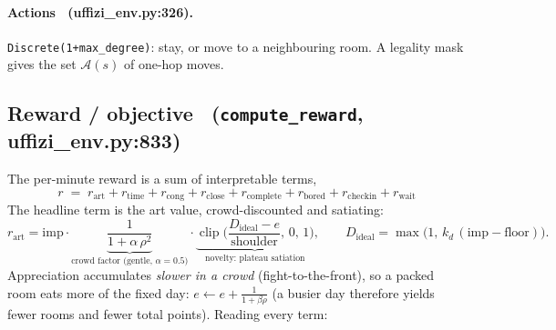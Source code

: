 \documentclass[11pt]{article}
\newcommand{\file}[1]{\texttt{\small #1}}
\newcommand{\co}[1]{\texttt{\small #1}}
\newcommand{\Acal}{\mathcal{A}}
\begin{document}
\paragraph{Actions \ (uffizi\_env.py:326).} \co{Discrete(1+max\_degree)}: stay, or move
to a neighbouring room. A legality mask gives the set $\Acal(s)$ of one-hop moves.

\subsection{Reward / objective \ (\file{compute\_reward}, uffizi\_env.py:833)}

The per-minute reward is a sum of interpretable terms,
\[
\boxed{\;r \;=\; r_{\text{art}} + r_{\text{time}} + r_{\text{cong}} + r_{\text{close}} + r_{\text{complete}} + r_{\text{bored}} + r_{\text{checkin}} + r_{\text{wait}}\;}
\]
The headline term is the art value, crowd-discounted and satiating:
\[
r_{\text{art}}=\mathrm{imp}\cdot\underbrace{\frac{1}{1+\alpha\,\rho^2}}_{\text{crowd factor (gentle, }\alpha=0.5)}\cdot\underbrace{\operatorname{clip}\!\Big(\frac{D_{\text{ideal}}-e}{\text{shoulder}},\,0,\,1\Big)}_{\text{novelty: plateau satiation}},\qquad
D_{\text{ideal}}=\max\!\big(1,\,k_{d}\,(\mathrm{imp}-\text{floor})\big).
\]
Appreciation accumulates \emph{slower in a crowd} (fight-to-the-front), so a packed room
eats more of the fixed day: $e \leftarrow e + \tfrac{1}{1+\beta\rho}$ (a busier day
therefore yields fewer rooms and fewer total points). Reading every term:
\end{document}
